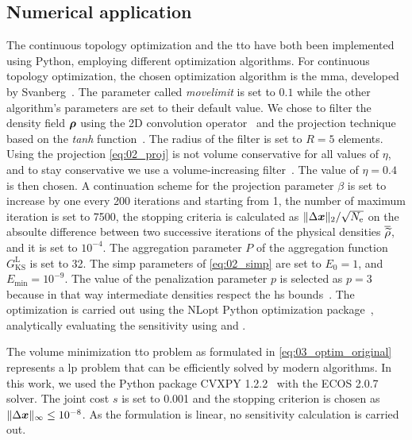 \subsection{Numerical application} \label{sec:03_applications}
The continuous topology optimization and the \gls{tto} have both been implemented using Python, employing different optimization algorithms. For continuous topology optimization, the chosen optimization algorithm is the \gls{mma}, developed by Svanberg~. The parameter called \textit{movelimit} is set to $0.1$ while the other algorithm's parameters are set to their default value. We chose to  filter the density field $\bm{\rho}$ using the 2D convolution operator~ and the projection technique based on the \textit{tanh} function~. The radius of the filter is set to $R=5$ elements.  Using the projection \eqref{eq:02_proj} is not volume conservative for all values of $\eta$, and to stay conservative we use a volume-increasing filter~. The value of $\eta = 0.4$ is then chosen. A continuation scheme for the projection parameter $\beta$ is set to increase by one every 200 iterations and starting from 1, the number of maximum iteration is set to 7500, the stopping criteria is calculated as $\Vert \Delta \bm{x} \Vert_2 / \sqrt{N_\text{e}}$ \cite{ferrari_new_2020} on the absoulte difference between two successive iterations of the physical densities $\overline{\widetilde{\rho}}$, and it is set to $10^{-4}$. The aggregation parameter $P$ of the aggregation function $G_{\text{KS}}^\text{L}$ is set to 32. The \gls{simp} parameters of \eqref{eq:02_simp} are set to $E_0 = 1$, and $E_{\textrm{min}} = 10^{-9}$. The value of the penalization parameter $p$ is selected as $p=3$ because in that way intermediate densities respect the \gls{hs} bounds~. The optimization is carried out using the NLopt Python optimization package~, analytically evaluating the sensitivity using  and .

The volume minimization \gls{tto} problem as formulated in \ref{eq:03_optim_original} represents a \gls{lp} problem that can be efficiently solved by modern algorithms. In this work, we used the Python package CVXPY 1.2.2~ with the ECOS 2.0.7~ solver. The joint cost $s$ is set to 0.001 and the stopping criterion is chosen as $\lVert\Delta \bm{x}\rVert_\infty \leq 10^{-8}$. As the formulation is linear, no sensitivity calculation is carried out.


